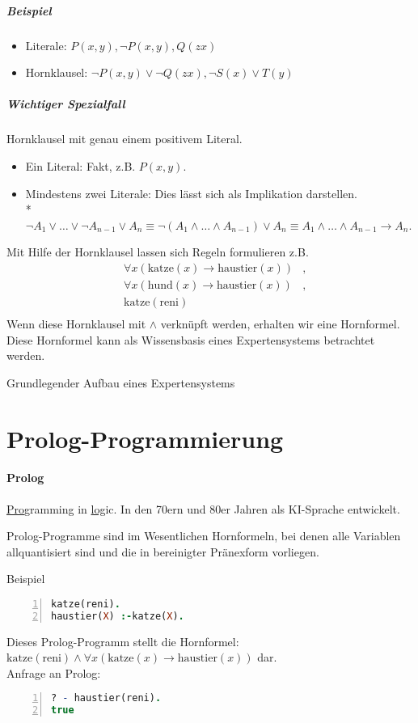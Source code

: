 \documentclass[a4paper]{scrartcl}
\begin{document}
\subparagraph{Beispiel}
\begin{itemize}
\item Literale: $P(x,y), \neg P(x,y), Q(zx)$\\
\item Hornklausel: $\neg P(x,y) \vee \neg Q(zx), \neg S(x) \vee T(y)$
\end{itemize}

\subparagraph{Wichtiger Spezialfall} Hornklausel mit genau einem positivem Literal.
\begin{itemize}
\item Ein Literal: Fakt, z.B. $P(x,y)$.
\item Mindestens zwei Literale: Dies lässt sich als Implikation darstellen.\\*
$ \neg A_1 \vee \dots \vee \neg A_{n-1} \vee A_n \equiv \neg (A_1 \wedge \dots \wedge A_{n-1} ) \vee A_n \equiv A_1 \wedge \dots \wedge A_{n-1} \rightarrow A_n$.
\end{itemize}

Mit Hilfe der Hornklausel lassen sich Regeln formulieren z.B.
\begin{align*}
&\forall x (\text{katze} (x) \rightarrow \text{haustier} (x)) &,\\
&\forall x (\text{hund} (x) \rightarrow \text{haustier} (x))&,\\
&\text{katze}(\text{reni})\\
\end{align*}
Wenn diese Hornklausel mit $\wedge$ verknüpft werden, erhalten wir eine Hornformel. Diese Hornformel kann als Wissensbasis eines Expertensystems betrachtet werden.

Grundlegender Aufbau eines Expertensystems

\section{Prolog-Programmierung}
\paragraph{Prolog} \underline{Pro}gramming in \underline{log}ic. In den 70ern und 80er Jahren als KI-Sprache entwickelt.

Prolog-Programme sind im Wesentlichen Hornformeln, bei denen alle Variablen allquantisiert sind und die in bereinigter Pränexform vorliegen.

Beispiel
\begin{lstlisting}[numbers=left, tabsize=4, language=Prolog]
katze(reni).
haustier(X) :-katze(X).
\end{lstlisting}
Dieses Prolog-Programm stellt die Hornformel:
$\text{katze}(\text{reni}) \wedge \forall x(\text{katze}(x) \rightarrow \text{haustier}(x))$ dar.\\
Anfrage an Prolog:
\begin{lstlisting}[numbers=left, tabsize=4, language=Prolog]
? - haustier(reni).
true
\end{lstlisting}
\end{document}
